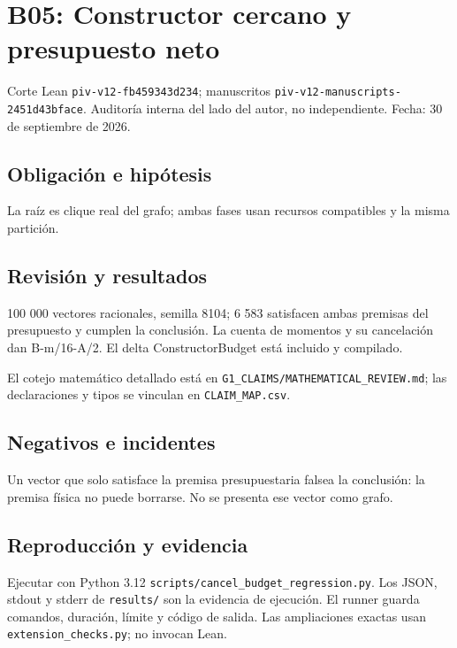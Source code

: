 \documentclass[11pt]{article}
\begin{document}
\section{B05: Constructor cercano y presupuesto
neto}\label{b05-constructor-cercano-y-presupuesto-neto}

Corte Lean \nolinkurl{piv-v12-fb459343d234}; manuscritos
\nolinkurl{piv-v12-manuscripts-2451d43bface}. Auditoría interna del lado
del autor, no independiente. Fecha: 30 de septiembre de 2026.

\subsection{Obligación e hipótesis}\label{obligaciuxf3n-e-hipuxf3tesis}

La raíz es clique real del grafo; ambas fases usan recursos compatibles
y la misma partición.

\subsection{Revisión y resultados}\label{revisiuxf3n-y-resultados}

100 000 vectores racionales, semilla 8104; 6 583 satisfacen ambas
premisas del presupuesto y cumplen la conclusión. La cuenta de momentos
y su cancelación dan B-m/16-A/2. El delta ConstructorBudget está
incluido y compilado.

El cotejo matemático detallado está en
\nolinkurl{G1_CLAIMS/MATHEMATICAL_REVIEW.md}; las declaraciones y tipos
se vinculan en \nolinkurl{CLAIM_MAP.csv}.

\subsection{Negativos e incidentes}\label{negativos-e-incidentes}

Un vector que solo satisface la premisa presupuestaria falsea la
conclusión: la premisa física no puede borrarse. No se presenta ese
vector como grafo.

\subsection{Reproducción y evidencia}\label{reproducciuxf3n-y-evidencia}

Ejecutar con Python 3.12 \nolinkurl{scripts/cancel_budget_regression.py}.
Los JSON, stdout y stderr de \nolinkurl{results/} son la evidencia de
ejecución. El runner guarda comandos, duración, límite y código de
salida. Las ampliaciones exactas usan \nolinkurl{extension_checks.py}; no
invocan Lean.
\end{document}
